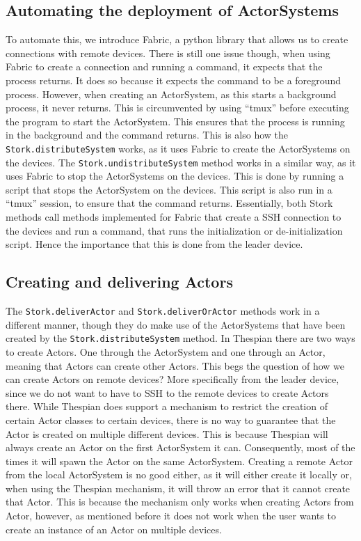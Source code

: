 \documentclass[a4paper]{article}
\begin{document}
\subsection{Automating the deployment of ActorSystems}
To automate this, we introduce Fabric, a python library that allows us to create connections with remote devices. There is still one issue though, when using Fabric to create a connection and running a command, it expects that the process returns. It does so because it expects the command to be a foreground process. However, when creating an ActorSystem, as this starts a background process, it never returns. This is circumvented by using \enquote{tmux} before executing the program to start the ActorSystem. This ensures that the process is running in the background and the command returns. This is also how the \lstinline|Stork.distributeSystem| works, as it uses Fabric to create the ActorSystems on the devices. The \lstinline|Stork.undistributeSystem| method works in a similar way, as it uses Fabric to stop the ActorSystems on the devices. This is done by running a script that stops the ActorSystem on the devices. This script is also run in a \enquote{tmux} session, to ensure that the command returns. Essentially, both Stork methods call methods implemented for Fabric that create a SSH connection to the devices and run a command, that runs the initialization or de-initialization script. Hence the importance that this is done from the leader device.

\subsection{Creating and delivering Actors}
\label{sec:creatinganddeliveringactors}
The \lstinline|Stork.deliverActor| and \lstinline|Stork.deliverOrActor| methods work in a different manner, though they do make use of the ActorSystems that have been created by the \lstinline|Stork.distributeSystem| method. In Thespian there are two ways to create Actors. One through the ActorSystem and one through an Actor, meaning that Actors can create other Actors.
This begs the question of how we can create Actors on remote devices? More specifically from the leader device, since we do not want to have to SSH to the remote devices to create Actors there. While Thespian does support a mechanism to restrict the creation of certain Actor classes to certain devices, there is no way to guarantee that the Actor is created on multiple different devices. This is because Thespian will always create an Actor on the first ActorSystem it can. Consequently, most of the times it will spawn the Actor on the same ActorSystem.
Creating a remote Actor from the local ActorSystem is no good either, as it will either create it locally or, when using the Thespian mechanism, it will throw an error that it cannot create that Actor. This is because the mechanism only works when creating Actors from Actor, however, as mentioned before it does not work when the user wants to create an instance of an Actor on multiple devices.
\end{document}
